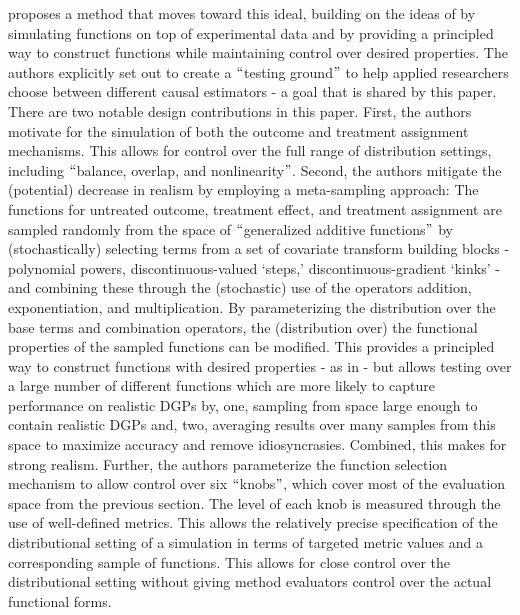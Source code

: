 \documentclass[../main.tex]{subfiles}
\begin{document}
\vspace{\baselineskip}
\textcite{Dorie2019Automated1} proposes a method that moves toward this ideal, building on the ideas of \textcite{Hill2011BayesianInference} by simulating functions on top of experimental data and \textcite{Kern2016AssessingPopulations} by providing a principled way to construct functions while maintaining control over desired properties. The authors explicitly set out to create a $``$testing ground$"$  to help applied researchers choose between different causal estimators - a goal that is shared by this paper. There are two notable design contributions in this paper. First, the authors motivate for the simulation of both the outcome and treatment assignment mechanisms. This allows for control over the full range of distribution settings, including $``$balance, overlap, and nonlinearity$"$. Second, the authors mitigate the (potential) decrease in realism by employing a meta-sampling approach: The functions for untreated outcome, treatment effect, and treatment assignment are sampled randomly from the space of $``$generalized additive functions$"$  by (stochastically) selecting terms from a set of covariate transform building blocks - polynomial powers, discontinuous-valued ‘steps,’ discontinuous-gradient ‘kinks’ - and combining these through the (stochastic) use of the operators addition, exponentiation, and multiplication. By parameterizing the distribution over the base terms and combination operators, the (distribution over) the functional properties of the sampled functions can be modified. This provides a principled way to construct functions with desired properties - as in \textcite{Kern2016AssessingPopulations} - but allows testing over a large number of different functions which are more likely to capture performance on realistic DGPs by, one, sampling from space large enough to contain realistic DGPs and, two, averaging results over many samples from this space to maximize accuracy and remove idiosyncrasies. Combined, this makes for strong realism. Further, the authors parameterize the function selection mechanism to allow control over six $``$knobs$"$, which cover most of the evaluation space from the previous section. The level of each knob is measured through the use of well-defined metrics. This allows the relatively precise specification of the distributional setting of a simulation in terms of targeted metric values and a corresponding sample of functions. This allows for close control over the distributional setting without giving method evaluators control over the actual functional forms. \par
\end{document}
